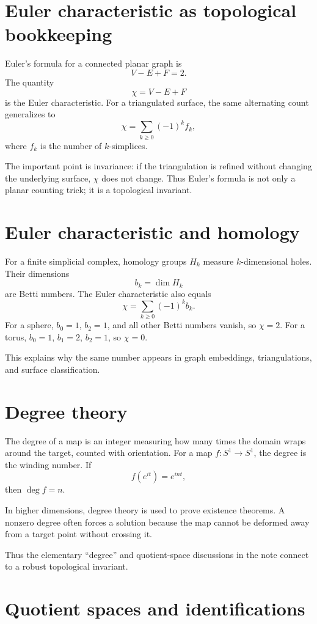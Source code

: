 \section{Euler characteristic as topological bookkeeping}

Euler's formula for a connected planar graph is
\[
  V-E+F=2.
\]
The quantity
\[
  \chi=V-E+F
\]
is the Euler characteristic.  For a triangulated surface, the same alternating count generalizes to
\[
  \chi=\sum_{k\ge0}(-1)^k f_k,
\]
where $f_k$ is the number of $k$-simplices.

The important point is invariance: if the triangulation is refined without changing the underlying surface, $\chi$ does not change.  Thus Euler's formula is not only a planar counting trick; it is a topological invariant.

\section{Euler characteristic and homology}

For a finite simplicial complex, homology groups $H_k$ measure $k$-dimensional holes.  Their dimensions
\[
  b_k=\dim H_k
\]
are Betti numbers.  The Euler characteristic also equals
\[
  \chi=\sum_{k\ge0}(-1)^k b_k.
\]
For a sphere, $b_0=1$, $b_2=1$, and all other Betti numbers vanish, so $\chi=2$.  For a torus, $b_0=1$, $b_1=2$, $b_2=1$, so $\chi=0$.

This explains why the same number appears in graph embeddings, triangulations, and surface classification.

\section{Degree theory}

The degree of a map is an integer measuring how many times the domain wraps around the target, counted with orientation.  For a map $f:S^1\to S^1$, the degree is the winding number.  If
\[
  f(e^{it})=e^{int},
\]
then $\deg f=n$.

In higher dimensions, degree theory is used to prove existence theorems.  A nonzero degree often forces a solution because the map cannot be deformed away from a target point without crossing it.

Thus the elementary ``degree'' and quotient-space discussions in the note connect to a robust topological invariant.

\section{Quotient spaces and identifications}

